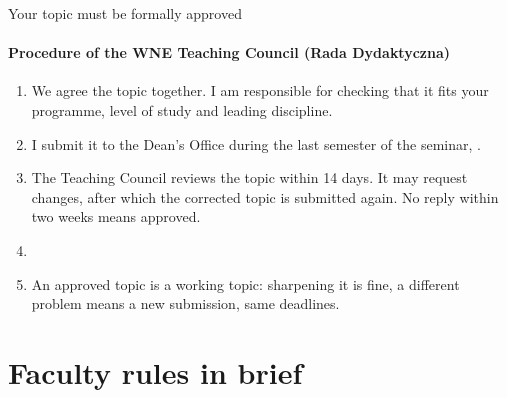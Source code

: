 \documentclass[aspectratio=169,11pt,t]{beamer}
\begin{document}
\begin{frame}{Your topic must be formally approved}
  \framesubtitle{Procedure of the WNE Teaching Council (Rada Dydaktyczna)}
  \begin{enumerate}
    \item We agree the topic together. I am responsible for checking that it fits your programme,
          level of study and leading discipline.
    \item I submit it to the Dean's Office during the last semester of the seminar,
          .
    \item The Teaching Council reviews the topic within 14 days. It may request changes,
          after which the corrected topic is submitted again. No reply within two weeks means approved.
    \item {}
    \item An approved topic is a working topic: sharpening it is fine, a different problem means
          a new submission, same deadlines.
  \end{enumerate}

\end{frame}

\section{Faculty rules in brief}
\end{document}
